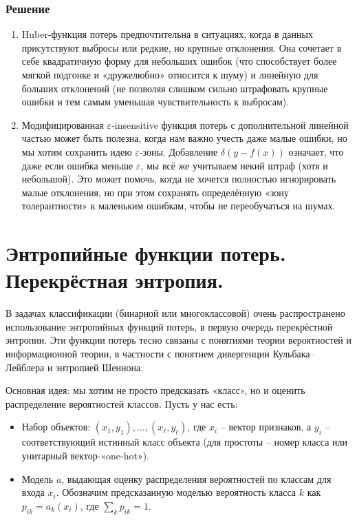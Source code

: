 \subsubsection{Решение}
\begin{enumerate}
    \item Huber-функция потерь предпочтительна в ситуациях, когда в данных присутствуют выбросы или редкие, но крупные отклонения. Она сочетает в себе квадратичную форму для небольших ошибок (что способствует более мягкой подгонке и «дружелюбно» относится к шуму) и линейную для больших отклонений (не позволяя слишком сильно штрафовать крупные ошибки и тем самым уменьшая чувствительность к выбросам).
    \item Модифицированная \(\varepsilon\)-insensitive функция потерь с дополнительной линейной частью может быть полезна, когда нам важно учесть даже малые ошибки, но мы хотим сохранить идею \(\varepsilon\)-зоны. Добавление \(\delta(y - f(x))\) означает, что даже если ошибка меньше \(\varepsilon\), мы всё же учитываем некий штраф (хотя и небольшой). Это может помочь, когда не хочется полностью игнорировать малые отклонения, но при этом сохранять определённую «зону толерантности» к маленьким ошибкам, чтобы не переобучаться на шумах.
\end{enumerate}

\section*{Энтропийные функции потерь. Перекрёстная энтропия.}

В задачах классификации (бинарной или многоклассовой) очень распространено использование энтропийных функций потерь, в первую очередь перекрёстной энтропии. Эти функции потерь тесно связаны с понятиями теории вероятностей и информационной теории, в частности с понятием дивергенции Кульбака–Лейблера и энтропией Шеннона.

Основная идея: мы хотим не просто предсказать «класс», но и оценить распределение вероятностей классов. Пусть у нас есть:

\begin{itemize}
    \item Набор объектов: $(x_1, y_1), \dots, (x_\ell, y_\ell)$, где $x_i$ – вектор признаков, а $y_i$ – соответствующий истинный класс объекта (для простоты – номер класса или унитарный вектор-«one-hot»).
    \item Модель $a$, выдающая оценку распределения вероятностей по классам для входа $x_i$. Обозначим предсказанную моделью вероятность класса $k$ как $p_{ik} = a_k(x_i)$, где $\sum_k p_{ik} = 1$.
\end{itemize}

